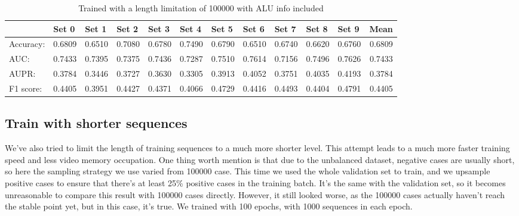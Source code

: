 \documentclass[10pt,a4paper]{article}
\begin{document}
\begin{spacing}{1.5}
		\begin{table}[H]
			\centering
			\caption{Trained with a length limitation of 100000 with ALU info included}
			\begin{tabular}{l|rrrrrrrrrr|r}
				& \multicolumn{1}{l}{Set 0} & \multicolumn{1}{l}{Set 1} & \multicolumn{1}{l}{Set 2} & \multicolumn{1}{l}{Set 3} & \multicolumn{1}{l}{Set 4} & \multicolumn{1}{l}{Set 5} & \multicolumn{1}{l}{Set 6} & \multicolumn{1}{l}{Set 7} & \multicolumn{1}{l}{Set 8} & \multicolumn{1}{l}{Set 9} & \multicolumn{1}{l}{Mean} \\ \hline \hline
				Accuracy: & 0.6809  & 0.6510  & 0.7080  & 0.6780  & 0.7490  & 0.6790  & 0.6510  & 0.6740  & 0.6620  & 0.6760  & 0.6809  \\
				AUC:  & 0.7433  & 0.7395  & 0.7375  & 0.7436  & 0.7287  & 0.7510  & 0.7614  & 0.7156  & 0.7496  & 0.7626  & 0.7433  \\
				AUPR: & 0.3784  & 0.3446  & 0.3727  & 0.3630  & 0.3305  & 0.3913  & 0.4052  & 0.3751  & 0.4035  & 0.4193  & 0.3784  \\
				F1 score: & 0.4405  & 0.3951  & 0.4427  & 0.4371  & 0.4066  & 0.4729  & 0.4416  & 0.4493  & 0.4404  & 0.4791  & 0.4405  \\
			\end{tabular}%
			\label{tab:addlabel}%
		\end{table}%
		
		\subsection{Train with shorter sequences}
		
		We've also tried to limit the length of training sequences to a much more shorter level. This attempt leads to a much more faster training speed and less video memory occupation. One thing worth mention is that due to the unbalanced dataset, negative cases are usually short, so here the sampling strategy we use varied from 100000 case. This time we used the whole validation set to train, and we upsample positive cases to ensure that there's at least 25\% positive cases in the training batch. It's the same with the validation set, so it becomes unreasonable to compare this result with 100000 cases directly. However, it still looked worse, as the 100000 cases actually haven't reach the stable point yet, but in this case, it's true. We trained with 100 epochs, with 1000 sequences in each epoch.
		

\end{spacing}
\end{document}
